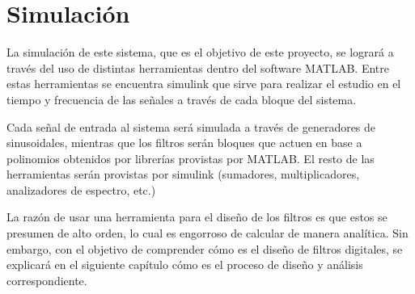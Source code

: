 \section{Simulación}
La simulación de este sistema, que es el objetivo de este proyecto, se logrará a través del uso de distintas herramientas dentro del software MATLAB. Entre estas herramientas se encuentra simulink que sirve para realizar el estudio en el tiempo y frecuencia de las señales a través de cada bloque del sistema.

Cada señal de entrada al sistema será simulada a través de generadores de sinusoidales, mientras que los filtros serán bloques que actuen en base a polinomios obtenidos por librerías provistas por MATLAB. El resto de las herramientas serán provistas por simulink (sumadores, multiplicadores, analizadores de espectro, etc.)

La razón de usar una herramienta para el diseño de los filtros es que estos se presumen de alto orden, lo cual es engorroso de calcular de manera analítica. Sin embargo, con el objetivo de comprender cómo es el diseño de filtros digitales, se explicará en el siguiente capítulo cómo es el proceso de diseño y análisis correspondiente.